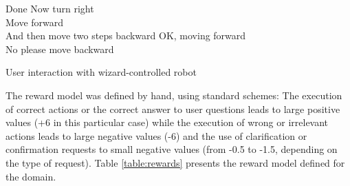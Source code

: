 \begin{Transcript}[p]
\begin{dialogue}
 Done\vspace{2mm}
 Now turn right \vspace{1mm} \\ 
 \vspace{2mm}
 Move forward \vspace{1mm} \\ 
 \vspace{2mm}
 And then move two steps backward\vspace{2mm}
 OK, moving forward\vspace{1mm} \\
 \vspace{2mm}
 No please move backward \vspace{1mm} \\ 
 \vspace{2mm}
\end{dialogue}
\vspace{-4mm} \hspace{1cm} \vspace{3mm}
\caption{User interaction with wizard-controlled robot}
\end{Transcript}

The reward model was defined by hand, using standard schemes: The execution of correct actions or the correct answer to user questions leads to large positive values (+6 in this particular case) while the execution of wrong or irrelevant actions leads to large negative values (-6) and the use of clarification or confirmation requests to small negative values (from -0.5 to -1.5, depending on the type of request). Table \ref{table:rewards} presents the reward model defined for the domain. 


